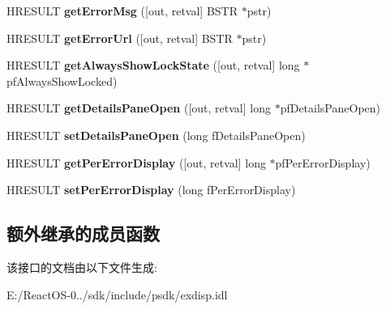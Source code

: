 \begin{DoxyCompactItemize}
H\+R\+E\+S\+U\+LT {\bfseries get\+Error\+Msg} (\mbox{[}out, retval\mbox{]} B\+S\+TR $\ast$pstr)
\item 
\mbox{\label{interface_s_h_doc_vw_1_1_i_script_error_list_a84877a4b0e0e543540bcf7ec3673c078}} 
H\+R\+E\+S\+U\+LT {\bfseries get\+Error\+Url} (\mbox{[}out, retval\mbox{]} B\+S\+TR $\ast$pstr)
\item 
\mbox{\label{interface_s_h_doc_vw_1_1_i_script_error_list_a3bf9c0a6a50f3634ba465a66bbb505f7}} 
H\+R\+E\+S\+U\+LT {\bfseries get\+Always\+Show\+Lock\+State} (\mbox{[}out, retval\mbox{]} long $\ast$pf\+Always\+Show\+Locked)
\item 
\mbox{\label{interface_s_h_doc_vw_1_1_i_script_error_list_abde012b3a95cbfc691e0762e95578c4a}} 
H\+R\+E\+S\+U\+LT {\bfseries get\+Details\+Pane\+Open} (\mbox{[}out, retval\mbox{]} long $\ast$pf\+Details\+Pane\+Open)
\item 
\mbox{\label{interface_s_h_doc_vw_1_1_i_script_error_list_adca4969c742e082c12435d6386acd35b}} 
H\+R\+E\+S\+U\+LT {\bfseries set\+Details\+Pane\+Open} (long f\+Details\+Pane\+Open)
\item 
\mbox{\label{interface_s_h_doc_vw_1_1_i_script_error_list_ad63dd2812ae236e43a8c682729679a07}} 
H\+R\+E\+S\+U\+LT {\bfseries get\+Per\+Error\+Display} (\mbox{[}out, retval\mbox{]} long $\ast$pf\+Per\+Error\+Display)
\item 
\mbox{\label{interface_s_h_doc_vw_1_1_i_script_error_list_a78f900d7b4c6b7f615cf1940a6d51317}} 
H\+R\+E\+S\+U\+LT {\bfseries set\+Per\+Error\+Display} (long f\+Per\+Error\+Display)
\end{DoxyCompactItemize}
\subsection*{额外继承的成员函数}


该接口的文档由以下文件生成\+:\begin{DoxyCompactItemize}
\item 
E\+:/\+React\+O\+S-\/0../sdk/include/psdk/exdisp.\+idl\end{DoxyCompactItemize}
